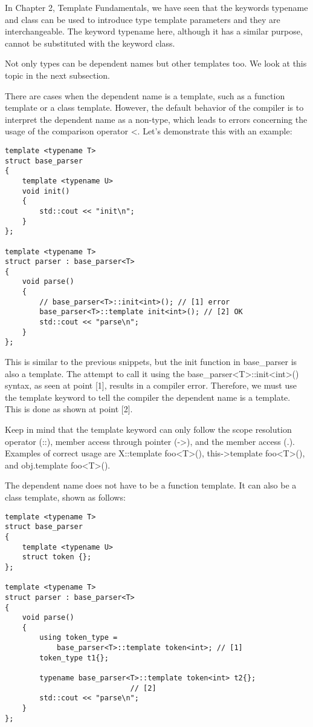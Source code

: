 \begin{tcolorbox}[breakable,enhanced jigsaw,colback=blue!5!white,colframe=blue!75!black,title={Note}]
In Chapter 2, Template Fundamentals, we have seen that the keywords
typename and class can be used to introduce type template parameters
and they are interchangeable. The keyword typename here, although it has
a similar purpose, cannot be substituted with the keyword class.
\end{tcolorbox}

Not only types can be dependent names but other templates too. We look at this topic in the next subsection.


There are cases when the dependent name is a template, such as a function template or a class template. However, the default behavior of the compiler is to interpret the dependent name as a non-type, which leads to errors concerning the usage of the comparison operator <. Let’s demonstrate this with an example:

\begin{lstlisting}[style=styleCXX]
template <typename T>
struct base_parser
{
	template <typename U>
	void init()
	{
		std::cout << "init\n";
	}
};

template <typename T>
struct parser : base_parser<T>
{
	void parse()
	{
		// base_parser<T>::init<int>(); // [1] error
		base_parser<T>::template init<int>(); // [2] OK
		std::cout << "parse\n";
	}
};
\end{lstlisting}

This is similar to the previous snippets, but the init function in base\_parser is also a template. The attempt to call it using the base\_parser<T>::init<int>() syntax, as seen at point [1], results in a compiler error. Therefore, we must use the template keyword to tell the compiler the dependent name is a template. This is done as shown at point [2].

Keep in mind that the template keyword can only follow the scope resolution operator (::), member access through pointer (->), and the member access (.). Examples of correct usage are X::template foo<T>(), this->template foo<T>(), and obj.template foo<T>().

The dependent name does not have to be a function template. It can also be a class template, shown as follows:

\begin{lstlisting}[style=styleCXX]
template <typename T>
struct base_parser
{
	template <typename U>
	struct token {};
};

template <typename T>
struct parser : base_parser<T>
{
	void parse()
	{
		using token_type =
			base_parser<T>::template token<int>; // [1]
		token_type t1{};
		
		typename base_parser<T>::template token<int> t2{};
		                     // [2]
		std::cout << "parse\n";
	}
};
\end{lstlisting}

